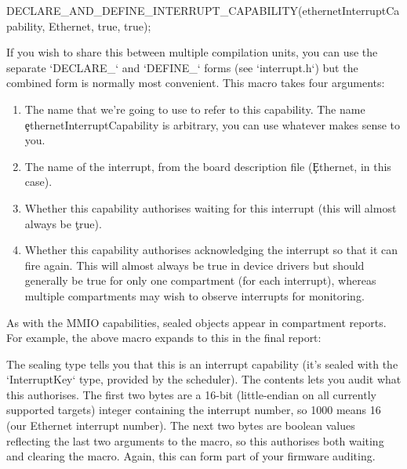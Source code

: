 \begin{cxxsnippet}
DECLARE_AND_DEFINE_INTERRUPT_CAPABILITY(ethernetInterruptCapability, Ethernet, true, true);
\end{cxxsnippet}

If you wish to share this between multiple compilation units, you can use the separate `DECLARE_` and `DEFINE_` forms (see `interrupt.h`) but the combined form is normally most convenient.
This macro takes four arguments:

\begin{enumerate}
	\item{The name that we're going to use to refer to this capability.
		The name \c{ethernetInterruptCapability} is arbitrary, you can use whatever makes sense to you.}
	\item{The name of the interrupt, from the board description file (\c{Ethernet}, in this case).}
	\item{Whether this capability authorises waiting for this interrupt (this will almost always be \c{true}).}
\item{Whether this capability authorises acknowledging the interrupt so that it can fire again.
	This will almost always be true in device drivers but should generally be true for only one compartment (for each interrupt), whereas multiple compartments may wish to observe interrupts for monitoring.}
\end{enumerate}

As with the MMIO capabilities, sealed objects appear in compartment reports.
For example, the above macro expands to this in the final report:

\begin{cxxsnippet}
        {
          "contents": "10000101",
          "kind": "SealedObject",
          "sealing_type": {
            "compartment": "sched",
            "key": "InterruptKey",
            "provided_by": "build/cheriot/cheriot/release/example-firmware.scheduler.compartment",
            "symbol": "__export.sealing_type.sched.InterruptKey"
          \}
\end{cxxsnippet}

The sealing type tells you that this is an interrupt capability (it's sealed with the `InterruptKey` type, provided by the scheduler).
The contents lets you audit what this authorises.
The first two bytes are a 16-bit (little-endian on all currently supported targets) integer containing the interrupt number, so 1000 means 16 (our Ethernet interrupt number).
The next two bytes are boolean values reflecting the last two arguments to the macro, so this authorises both waiting and clearing the macro.
Again, this can form part of your firmware auditing.

